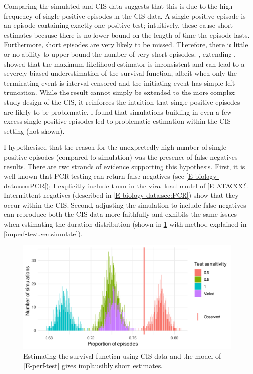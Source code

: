 \documentclass[thesis.tex]{subfiles}
\begin{document}
Comparing the simulated and CIS data suggests that this is due to the high frequency of single positive episodes in the CIS data.
A single positive episode is an episode containing exactly one positive test; intuitively, these cause short estimates because there is no lower bound on the length of time the episode lasts.
Furthermore, short episodes are very likely to be missed.
Therefore, there is little or no ability to upper bound the number of very short episodes.
\Textcite{shenNonparametrica}, extending \textcite{panNote}, showed that the maximum likelihood estimator is inconsistent and can lead to a severely biased underestimation of the survival function, albeit when only the terminating event is interval censored and the initiating event has simple left truncation.
While the result cannot simply be extended to the more complex study design of the CIS, it reinforces the intuition that single positive episodes are likely to be problematic.
I found that simulations building in even a few excess single positive episodes led to problematic estimation within the CIS setting (not shown).

I hypothesised that the reason for the unexpectedly high number of single positive episodes (compared to simulation) was the presence of false negatives results.
There are two strands of evidence supporting this hypothesis.
First, it is well known that PCR testing can return false negatives  (see \cref{E-biology-data:sec:PCR}); I explicitly include them in the viral load model of \cref{E-ATACCC}.
Intermittent negatives (described in  \cref{E-biology-data:sec:PCR}) show that they occur within the CIS.
Second, adjusting the simulation to include false negatives can reproduce both the CIS data more faithfully and exhibits the same issues when estimating the duration distribution (shown in \cref{imperf-test:fig:sim-single-pos} with method explained in \cref{imperf-test:sec:simulate}).
\begin{figure}
  \centering \includegraphics{cis-imperfect-testing/sim-single-positive-episodes}
  \caption[Estimating survival using CIS data assuming perfect testing]{Estimating the survival function using CIS data and the model of \cref{E-perf-test} gives implausibly short estimates.}
  \label{imperf-test:fig:sim-single-pos}
\end{figure}
\end{document}
